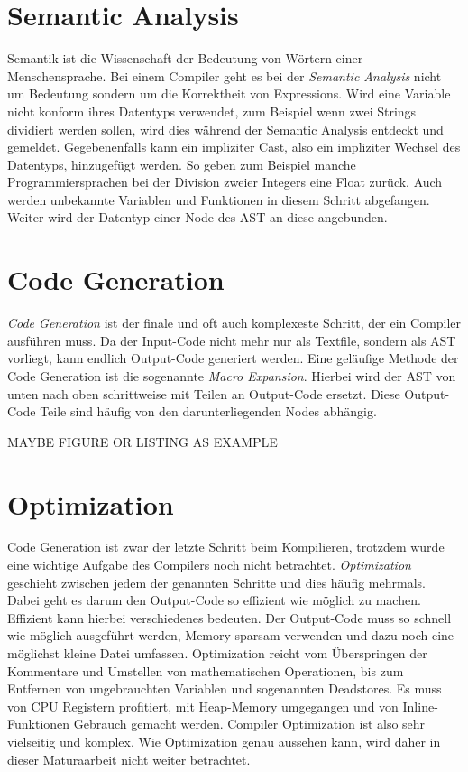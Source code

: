 \section{Semantic Analysis}
Semantik ist die Wissenschaft der Bedeutung von Wörtern einer Menschensprache. Bei einem Compiler geht es bei der \textit{Semantic Analysis} nicht um Bedeutung sondern um die Korrektheit von Expressions.
Wird eine Variable nicht konform ihres Datentyps verwendet, zum Beispiel wenn zwei Strings dividiert werden sollen, wird dies während der Semantic Analysis entdeckt und gemeldet.
Gegebenenfalls kann ein impliziter Cast, also ein impliziter Wechsel des Datentyps, hinzugefügt werden.
So geben zum Beispiel manche Programmiersprachen bei der Division zweier Integers eine Float zurück.
Auch werden unbekannte Variablen und Funktionen in diesem Schritt abgefangen.
Weiter wird der Datentyp einer Node des AST an diese angebunden.

\section{Code Generation} \label{sec:traditional_code_generation}
\textit{Code Generation} ist der finale und oft auch komplexeste Schritt, der ein Compiler ausführen muss.
Da der Input-Code nicht mehr nur als Textfile, sondern als AST vorliegt, kann endlich Output-Code generiert werden. Eine geläufige Methode der Code Generation ist die sogenannte \textit{Macro Expansion}.
Hierbei wird der AST von unten nach oben schrittweise mit Teilen an Output-Code ersetzt.
Diese Output-Code Teile sind häufig von den darunterliegenden Nodes abhängig. 

MAYBE FIGURE OR LISTING AS EXAMPLE

\section{Optimization}
Code Generation ist zwar der letzte Schritt beim Kompilieren, trotzdem wurde eine wichtige Aufgabe des Compilers noch nicht betrachtet. \textit{Optimization} geschieht zwischen jedem der genannten Schritte und dies häufig mehrmals.
Dabei geht es darum den Output-Code so effizient wie möglich zu machen. Effizient kann hierbei verschiedenes bedeuten.
Der Output-Code muss so schnell wie möglich ausgeführt werden, Memory sparsam verwenden und dazu noch eine möglichst kleine Datei umfassen. 
Optimization reicht vom Überspringen der Kommentare und Umstellen von mathematischen Operationen, bis zum Entfernen von ungebrauchten Variablen und sogenannten Deadstores.
Es muss von CPU Registern profitiert, mit Heap-Memory umgegangen und von Inline-Funktionen Gebrauch gemacht werden. Compiler Optimization ist also sehr vielseitig und komplex.
Wie Optimization genau aussehen kann, wird daher in dieser Maturaarbeit nicht weiter betrachtet.